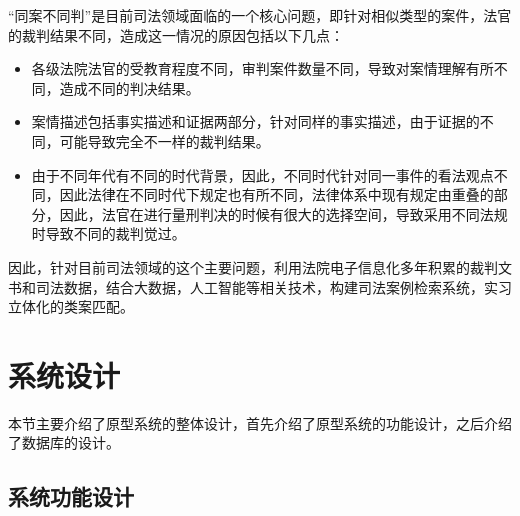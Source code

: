 “同案不同判”是目前司法领域面临的一个核心问题，即针对相似类型的案件，法官的裁判结果不同，造成这一情况的原因包括以下几点：
\begin{itemize}
    \item 各级法院法官的受教育程度不同，审判案件数量不同，导致对案情理解有所不同，造成不同的判决结果。
    \item 案情描述包括事实描述和证据两部分，针对同样的事实描述，由于证据的不同，可能导致完全不一样的裁判结果。
    \item 由于不同年代有不同的时代背景，因此，不同时代针对同一事件的看法观点不同，因此法律在不同时代下规定也有所不同，法律体系中现有规定由重叠的部分，因此，法官在进行量刑判决的时候有很大的选择空间，导致采用不同法规时导致不同的裁判觉过。
\end{itemize}


因此，针对目前司法领域的这个主要问题，利用法院电子信息化多年积累的裁判文书和司法数据，结合大数据，人工智能等相关技术，构建司法案例检索系统，实习立体化的类案匹配。


\section{系统设计}

本节主要介绍了原型系统的整体设计，首先介绍了原型系统的功能设计，之后介绍了数据库的设计。

\subsection{系统功能设计}

